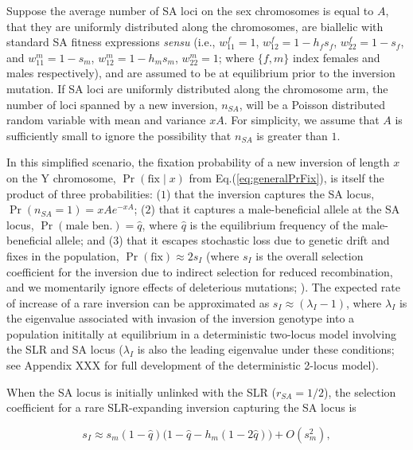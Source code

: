 \documentclass{article}[12pt]
\newcommand\hl[1]{%
  \bgroup
  \hskip0pt\color{blue!80!black}%
  #1%
  \egroup
}
\begin{document}
Suppose the average number of SA loci on the sex chromosomes is equal to $A$, that they are uniformly distributed along the chromosomes, are biallelic with standard SA fitness expressions {\itshape sensu} \citet{Kidwell1977} (i.e., $w_{11}^{f} = 1$, $w_{12}^{f} = 1 - h_f s_f$, $w_{22}^{f} = 1 - s_f$, and $w_{11}^{m} = 1 - s_m$, $w_{12}^{m} = 1 - h_m s_m$, $w_{22}^{m} = 1$; where $\{f,m\}$ index females and males respectively), and are assumed to be at equilibrium prior to the inversion mutation. If SA loci are uniformly distributed along the chromosome arm, the number of loci spanned by a new inversion, $n_{SA}$, will be a Poisson distributed random variable with mean and variance $xA$. For simplicity, we assume that $A$ is sufficiently small to ignore the possibility that $n_{SA}$ is greater than $1$. 

In this simplified scenario, the fixation probability of a new inversion of length $x$ on the Y chromosome, $\Pr(\text{fix} \mid x)$ from Eq.(\ref{eq:generalPrFix}), is itself the product of three probabilities: ($1$) that the inversion captures the SA locus, $\Pr(n_{SA} = 1) = xA e^{-xA}$; ($2$) that it captures a male-beneficial allele at the SA locus, $\Pr(\text{male~ben.}) = \hat{q}$, where $\hat{q}$ is the equilibrium frequency of the male-beneficial allele; and ($3$) that it escapes stochastic loss due to genetic drift and fixes in the population, $\Pr(\text{fix}) \approx 2 s_I$ (where $s_I$ is the overall selection coefficient for the inversion due to indirect selection for reduced recombination, and we momentarily ignore effects of deleterious mutations; \citealt{Haldane1927}). The expected rate of increase of a rare inversion can be approximated as $s_I \approx (\lambda_I - 1)$, where $\lambda_I$ is the eigenvalue associated with invasion of the inversion genotype into a population inititally at equilibrium in a deterministic two-locus model involving the SLR and SA locus ($\lambda_I$ is also the leading eigenvalue under these conditions; see Appendix \hl{XXX} for full development of the deterministic 2-locus model). 

When the SA locus is initially unlinked with the SLR ($r_{SA} = 1/2$), the selection coefficient for a rare SLR-expanding inversion capturing the SA locus is
\begin{linenomath*}
\begin{equation}\label{eq:SApFix2LocUnlinked}
	s_I \approx s_m (1 - \hat{q}) \big( 1 - \hat{q} - h_m(1 - 2\hat{q}) \big) + O(s_{m}^{2}),
\end{equation}
\end{linenomath*}
\end{document}
